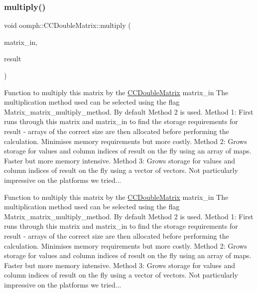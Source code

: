 \mbox{\label{classoomph_1_1CCDoubleMatrix_ae6834fcfc28dca27243ec53ea48d34be}} 
\subsubsection{\texorpdfstring{multiply()}{multiply()}\hspace{0.1cm}{\footnotesize\ttfamily [2/2]}}
{\footnotesize\ttfamily void oomph\+::\+C\+C\+Double\+Matrix\+::multiply (\begin{DoxyParamCaption}\item[{const \hyperlink{classoomph_1_1CCDoubleMatrix}{C\+C\+Double\+Matrix} \&}]{matrix\+\_\+in,  }\item[{\hyperlink{classoomph_1_1CCDoubleMatrix}{C\+C\+Double\+Matrix} \&}]{result }\end{DoxyParamCaption})}



Function to multiply this matrix by the \hyperlink{classoomph_1_1CCDoubleMatrix}{C\+C\+Double\+Matrix} matrix\+\_\+in The multiplication method used can be selected using the flag Matrix\+\_\+matrix\+\_\+multiply\+\_\+method. By default Method 2 is used. Method 1\+: First runs through this matrix and matrix\+\_\+in to find the storage requirements for result -\/ arrays of the correct size are then allocated before performing the calculation. Minimises memory requirements but more costly. Method 2\+: Grows storage for values and column indices of result \textquotesingle{}on the fly\textquotesingle{} using an array of maps. Faster but more memory intensive. Method 3\+: Grows storage for values and column indices of result \textquotesingle{}on the fly\textquotesingle{} using a vector of vectors. Not particularly impressive on the platforms we tried... 

Function to multiply this matrix by the \hyperlink{classoomph_1_1CCDoubleMatrix}{C\+C\+Double\+Matrix} matrix\+\_\+in The multiplication method used can be selected using the flag Matrix\+\_\+matrix\+\_\+multiply\+\_\+method. By default Method 2 is used. Method 1\+: First runs through this matrix and matrix\+\_\+in to find the storage requirements for result -\/ arrays of the correct size are then allocated before performing the calculation. Minimises memory requirements but more costly. Method 2\+: Grows storage for values and column indices of result \textquotesingle{}on the fly\textquotesingle{} using an array of maps. Faster but more memory intensive. Method 3\+: Grows storage for values and column indices of result \textquotesingle{}on the fly\textquotesingle{} using a vector of vectors. Not particularly impressive on the platforms we tried... 

